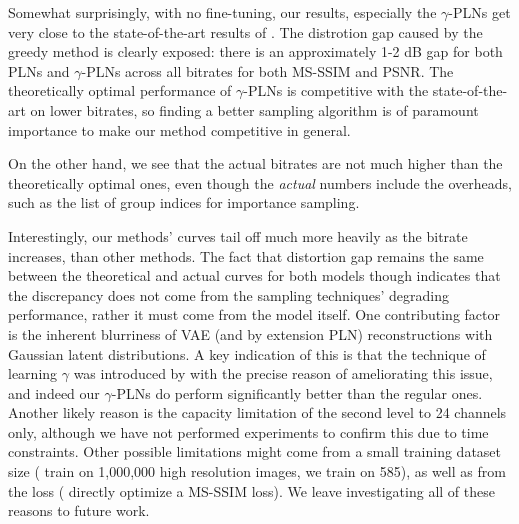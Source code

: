 \par
Somewhat surprisingly, with no fine-tuning, our results, especially the
$\gamma$-PLNs get very close to the state-of-the-art results of
\cite{balle2018variational}. The distrotion gap caused by the greedy method is
clearly exposed: there is an approximately 1-2 dB gap for both PLNs and
$\gamma$-PLNs across all bitrates for both MS-SSIM and PSNR.
The theoretically optimal performance of $\gamma$-PLNs is competitive with the
state-of-the-art on lower bitrates, so finding a better sampling algorithm
is of paramount importance to make our method competitive in general.
\par
On the other hand, we see that the actual bitrates are not much higher than the
theoretically optimal ones, even
though the \textit{actual} numbers include the overheads, such as the list of
group indices for importance sampling.

\par
Interestingly, our methods' curves tail off much more heavily as the bitrate increases,
than other methods. The fact that distortion gap remains the same between the
theoretical and actual curves for both models though indicates that the discrepancy
does not come from the sampling techniques' degrading performance, rather it
must come from the model itself. One contributing factor is the inherent
blurriness of VAE (and by extension PLN) reconstructions with Gaussian latent
distributions. A key indication of this is that the technique of learning
$\gamma$ was introduced by \cite{dai2019diagnosing} with the precise reason of
ameliorating this issue, and indeed our $\gamma$-PLNs do perform significantly
better than the regular ones. Another likely reason is the capacity limitation
of the second level to 24 channels only, although we have not performed
experiments to confirm this due to time constraints. Other possible limitations
might come from a small training dataset size (\cite{balle2018variational} train
on 1,000,000 high resolution images, we train on 585), as well as from the loss
(\cite{balle2018variational} directly optimize a MS-SSIM loss). We leave
investigating all of these reasons to future work.

